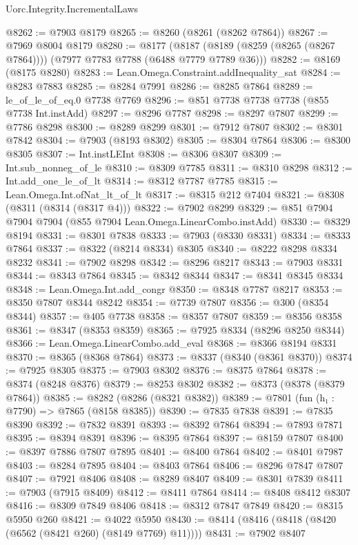 \begin{lexlean}{Uorc.Integrity.IncrementalLaws}
\begin{coremodule}
@8262 := @7903 @8179
@8265 := @8260 (@8261 (@8262 @7864))
@8267 := @7969 @8004 @8179
@8280 := @8177
    (@8187 (@8189 (@8259 (@8265 (@8267 @7864)))) (@7977 @7783 @7788 (@6488 @7779 @7789 @36)))
@8282 := @8169 (@8175 @8280)
@8283 := Lean.Omega.Constraint.addInequality_sat
@8284 := @8283 @7883
@8285 := @8284 @7991
@8286 := @8285 @7864
@8289 := le_of_le_of_eq.{0} @7738 @7769
@8296 := @851 @7738 @7738 @7738 (@855 @7738 Int.instAdd)
@8297 := @8296 @7787
@8298 := @8297 @7807
@8299 := @7786 @8298
@8300 := @8289 @8299
@8301 := @7912 @7807
@8302 := @8301 @7842
@8304 := @7903 (@8193 @8302)
@8305 := @8304 @7864
@8306 := @8300 @8305
@8307 := Int.instLEInt
@8308 := @8306 @8307
@8309 := Int.sub_nonneg_of_le
@8310 := @8309 @7785
@8311 := @8310 @8298
@8312 := Int.add_one_le_of_lt
@8314 := @8312 @7787 @7785
@8315 := Lean.Omega.Int.ofNat_lt_of_lt
@8317 := @8315 @212 @7404
@8321 := @8308 (@8311 (@8314 (@8317 @4)))
@8322 := @7902 @8299
@8329 := @851 @7904 @7904 @7904 (@855 @7904 Lean.Omega.LinearCombo.instAdd)
@8330 := @8329 @8194
@8331 := @8301 @7838
@8333 := @7903 (@8330 @8331)
@8334 := @8333 @7864
@8337 := @8322 (@8214 @8334) @8305
@8340 := @8222 @8298 @8334 @8232
@8341 := @7902 @8298
@8342 := @8296 @8217
@8343 := @7903 @8331
@8344 := @8343 @7864
@8345 := @8342 @8344
@8347 := @8341 @8345 @8334
@8348 := Lean.Omega.Int.add_congr
@8350 := @8348 @7787 @8217
@8353 := @8350 @7807 @8344 @8242
@8354 := @7739 @7807
@8356 := @300 (@8354 @8344)
@8357 := @405 @7738
@8358 := @8357 @7807
@8359 := @8356 @8358
@8361 := @8347 (@8353 @8359)
@8365 := @7925 @8334 (@8296 @8250 @8344)
@8366 := Lean.Omega.LinearCombo.add_eval
@8368 := @8366 @8194 @8331
@8370 := @8365 (@8368 @7864)
@8373 := @8337 (@8340 (@8361 @8370))
@8374 := @7925 @8305
@8375 := @7903 @8302
@8376 := @8375 @7864
@8378 := @8374 (@8248 @8376)
@8379 := @8253 @8302
@8382 := @8373 (@8378 (@8379 @7864))
@8385 := @8282 (@8286 (@8321 @8382))
@8389 := @7801 (fun (h₁ : @7790) => @7865 (@8158 @8385))
@8390 := @7835 @7838
@8391 := @7835 @8390
@8392 := @7832 @8391
@8393 := @8392 @7864
@8394 := @7893 @7871
@8395 := @8394 @8391
@8396 := @8395 @7864
@8397 := @8159 @7807
@8400 := @8397 @7886 @7807 @7895
@8401 := @8400 @7864
@8402 := @8401 @7987
@8403 := @8284 @7895
@8404 := @8403 @7864
@8406 := @8296 @7847 @7807
@8407 := @7921 @8406
@8408 := @8289 @8407
@8409 := @8301 @7839
@8411 := @7903 (@7915 @8409)
@8412 := @8411 @7864
@8414 := @8408 @8412 @8307
@8416 := @8309 @7849 @8406
@8418 := @8312 @7847 @7849
@8420 := @8315 @5950 @260
@8421 := @4022 @5950
@8430 := @8414 (@8416 (@8418 (@8420 (@6562 (@8421 @260) (@8149 @7769) @11))))
@8431 := @7902 @8407

\end{coremodule}
\end{lexlean}
